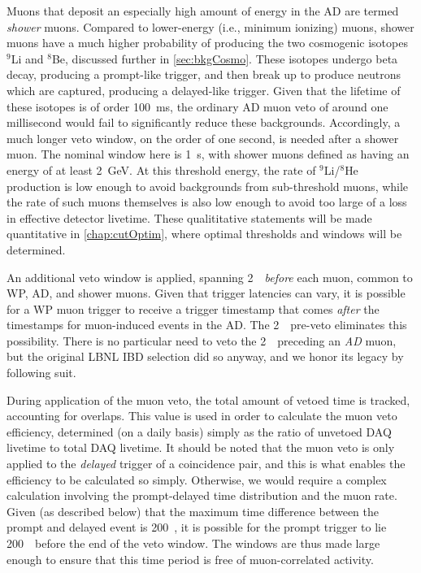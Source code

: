 \documentclass[../thesis.tex]{subfiles}
\begin{document}
Muons that deposit an especially high amount of energy in the AD are termed
\emph{shower} muons. Compared to lower-energy (i.e., minimum ionizing) muons,
shower muons have a much higher probability of producing the two cosmogenic
isotopes $^9$Li and $^8$Be, discussed further in \autoref{sec:bkgCosmo}. These
isotopes undergo beta decay, producing a prompt-like trigger, and then break up
to produce neutrons which are captured, producing a delayed-like trigger. Given
that the lifetime of these isotopes is of order 100~ms, the ordinary AD muon
veto of around one millisecond would fail to significantly reduce these
backgrounds. Accordingly, a much longer veto window, on the order of one second,
is needed after a shower muon. The nominal window here is 1~s, with shower muons
defined as having an energy of at least 2~GeV. At this threshold energy, the
rate of $^9$Li/$^8$He production is low enough to avoid backgrounds from
sub-threshold muons, while the rate of such muons themselves is also low enough
to avoid too large of a loss in effective detector livetime. These qualititative
statements will be made quantitative in \autoref{chap:cutOptim}, where optimal
thresholds and windows will be determined.

An additional veto window is applied, spanning 2~\us\ \emph{before} each muon,
common to WP, AD, and shower muons. Given that trigger latencies can vary, it is
possible for a WP muon trigger to receive a trigger timestamp that comes
\emph{after} the timestamps for muon-induced events in the AD. The 2~\us\
pre-veto eliminates this possibility. There is no particular need to veto the
2~\us\ preceding an \emph{AD} muon, but the original LBNL IBD selection did so
anyway, and we honor its legacy by following suit.

During application of the muon veto, the total amount of vetoed time is tracked,
accounting for overlaps. This value is used in order to calculate the muon veto
efficiency, determined (on a daily basis) simply as the ratio of unvetoed DAQ
livetime to total DAQ livetime. It should be noted that the muon veto is only
applied to the \emph{delayed} trigger of a coincidence pair, and this is what
enables the efficiency to be calculated so simply. Otherwise, we would require a
complex calculation involving the prompt-delayed time distribution and the muon
rate. Given (as described below) that the maximum time difference between the
prompt and delayed event is 200~\us, it is possible for the prompt trigger to
lie 200~\us\ before the end of the veto window. The windows are thus made large
enough to ensure that this time period is free of muon-correlated activity.
\end{document}
